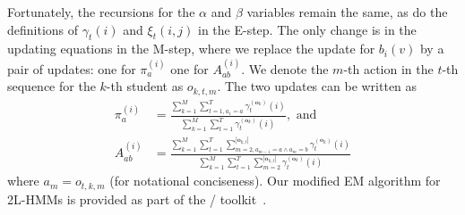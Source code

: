 Fortunately, the recursions for the $\alpha$ and $\beta$ variables remain
the same, as do the definitions of $\gamma_t(i)$ and $\xi_t(i,j)$ in the
E-step. The only change is in the updating equations in the M-step,
where we replace the update for $b_i(v)$ by a pair of updates: one for
$\pi^{(i)}_a$ one for $A^{(i)}_{ab}$. We denote the $m$-th action in the
$t$-th sequence for the $k$-th student as $o_{k,t,m}$. The two updates can
be written as
\begin{align}
  \pi^{(i)}_{a}
  &= \frac{\sum_{k=1}^M \sum_{t=1,a_1 = a}^T \gamma^{(\mathbf{o}_k)}_t(i)}
  {\sum_{k=1}^M \sum_{t=1}^T \gamma^{(\mathbf{o}_k)}_t(i)}, \text{ and }\\
  A^{(i)}_{ab}
  &= \frac{\sum_{k=1}^M \sum_{t=1}^T
  \sum_{m=2,a_{m-1}=a \land a_m = b}^{|\mathbf{o}_{k,t}|}
  \gamma^{(\mathbf{o}_k)}_t(i)}
  {\sum_{k=1}^M \sum_{t=1}^T \sum_{m=2}^{|\mathbf{o}_{k,t}|}
  \gamma^{(\mathbf{o}_k)}_t(i)}
\end{align}
where $a_m = o_{t,k,m}$ (for notational conciseness). Our modified EM
algorithm for 2L-HMMs is provided as part of the \meta/
toolkit~\citemeta{}.
